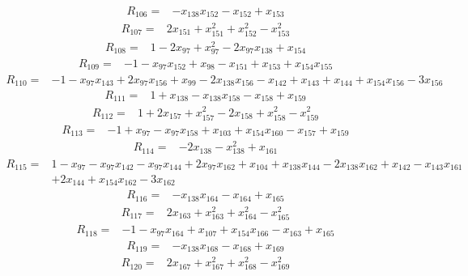 \begin{align*}
 R_{106}={}&-x_{138}x_{152} -x_{152} +x_{153}
\end{align*}
\begin{align*}
 R_{107}={}&2x_{151} +x_{151}^{2} +x_{152}^{2} -x_{153}^{2}
\end{align*}
\begin{align*}
 R_{108}={}&1 -2x_{97} +x_{97}^{2} -2x_{97}x_{138} +x_{154}
\end{align*}
\begin{align*}
 R_{109}={}&-1 -x_{97}x_{152} +x_{98} -x_{151} +x_{153} +x_{154}x_{155}
\end{align*}
\begin{align*}
 R_{110}={}&-1 -x_{97}x_{143} +2x_{97}x_{156} +x_{99} -2x_{138}x_{156} -x_{142} +x_{143} +x_{144} +x_{154}x_{156} -3x_{156}
\end{align*}
\begin{align*}
 R_{111}={}&1 +x_{138} -x_{138}x_{158} -x_{158} +x_{159}
\end{align*}
\begin{align*}
 R_{112}={}&1 +2x_{157} +x_{157}^{2} -2x_{158} +x_{158}^{2} -x_{159}^{2}
\end{align*}
\begin{align*}
 R_{113}={}&-1 +x_{97} -x_{97}x_{158} +x_{103} +x_{154}x_{160} -x_{157} +x_{159}
\end{align*}
\begin{align*}
 R_{114}={}&-2x_{138} -x_{138}^{2} +x_{161}
\end{align*}
\begin{align*}
 R_{115}={}&1 -x_{97} -x_{97}x_{142} -x_{97}x_{144} +2x_{97}x_{162} +x_{104} +x_{138}x_{144} -2x_{138}x_{162} +x_{142} -x_{143}x_{161}\\
 &+2x_{144} +x_{154}x_{162} -3x_{162}
\end{align*}
\begin{align*}
 R_{116}={}&-x_{138}x_{164} -x_{164} +x_{165}
\end{align*}
\begin{align*}
 R_{117}={}&2x_{163} +x_{163}^{2} +x_{164}^{2} -x_{165}^{2}
\end{align*}
\begin{align*}
 R_{118}={}&-1 -x_{97}x_{164} +x_{107} +x_{154}x_{166} -x_{163} +x_{165}
\end{align*}
\begin{align*}
 R_{119}={}&-x_{138}x_{168} -x_{168} +x_{169}
\end{align*}
\begin{align*}
 R_{120}={}&2x_{167} +x_{167}^{2} +x_{168}^{2} -x_{169}^{2}
\end{align*}
